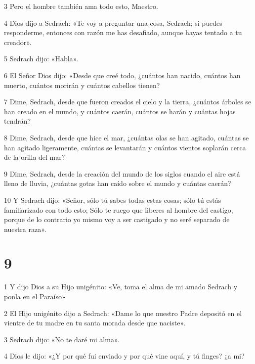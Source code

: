 \par 3 Pero el hombre también ama todo esto, Maestro.

\par 4 Dios dijo a Sedrach: «Te voy a preguntar una cosa, Sedrach; si puedes responderme, entonces con razón me has desafiado, aunque hayas tentado a tu creador».

\par 5 Sedrach dijo: «Habla».

\par 6 El Señor Dios dijo: «Desde que creé todo, ¿cuántos han nacido, cuántos han muerto, cuántos morirán y cuántos cabellos tienen?

\par 7 Dime, Sedrach, desde que fueron creados el cielo y la tierra, ¿cuántos árboles se han creado en el mundo, y cuántos caerán, cuántos se harán y cuántas hojas tendrán?

\par 8 Dime, Sedrach, desde que hice el mar, ¿cuántas olas se han agitado, cuántas se han agitado ligeramente, cuántas se levantarán y cuántos vientos soplarán cerca de la orilla del mar?

\par 9 Dime, Sedrach, desde la creación del mundo de los siglos cuando el aire está lleno de lluvia, ¿cuántas gotas han caído sobre el mundo y cuántas caerán?

\par 10 Y Sedrach dijo: «Señor, sólo tú sabes todas estas cosas; sólo tú estás familiarizado con todo esto; Sólo te ruego que liberes al hombre del castigo, porque de lo contrario yo mismo voy a ser castigado y no seré separado de nuestra raza».

\chapter{9}

\par 1 Y dijo Dios a su Hijo unigénito: «Ve, toma el alma de mi amado Sedrach y ponla en el Paraíso».

\par 2 El Hijo unigénito dijo a Sedrach: «Dame lo que nuestro Padre depositó en el vientre de tu madre en tu santa morada desde que naciste».

\par 3 Sedrach dijo: «No te daré mi alma».

\par 4 Dios le dijo: «¿Y por qué fui enviado y por qué vine aquí, y tú finges? ¿a mi?

